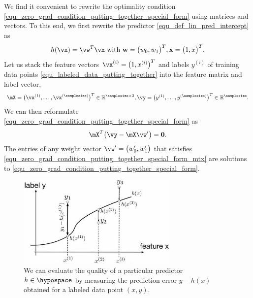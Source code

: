 \documentclass[12pt]{report}
\begin{document}
We find it convenient to rewrite the optimality condition \eqref{equ_zero_grad_condition_putting_together_special_form} 
using matrices and vectors. To this end, we first rewrite the 
predictor \eqref{equ_def_lin_pred_intercept} as 
$$ h(\vx) = \vw^{T} \vx \mbox{ with } \mathbf{w} = \big(w_{0},w_{1}\big)^{T}, \mathbf{x} = \big(1,x\big)^{T}.$$
Let us stack the feature vectors $\vx^{(i)} = \big(1,x^{(i)} \big)^{T}$ 
and labels $y^{(i)}$ of training data points \eqref{equ_labeled_data_putting_together} 
into the feature matrix and label vector, 
\begin{equation}
\mX  = \big(\vx^{(1)},\ldots,\vx^{(\samplesize)}\big)^{T} \in \mathbb{R}^{\samplesize \times 2}, \vy = \big(y^{(1)},\ldots,y^{(\samplesize)}\big)^{T} \in \mathbb{R}^{\samplesize}. 
\end{equation} 
We can then reformulate \eqref{equ_zero_grad_condition_putting_together_special_form} as 
\begin{equation}
\label{equ_zero_grad_condition_putting_together_special_form_mtx}
\mX^{T} \big( \vy - \mX \vw' \big) = \mathbf{0}. 
\end{equation} 
The entries of any weight vector $\vw' = \big(w_{0}',w_{1}'\big)$ that satisfies 
\eqref{equ_zero_grad_condition_putting_together_special_form_mtx} are solutions to 
\eqref{equ_zero_grad_condition_putting_together_special_form}. 




\begin{figure}[htbp]
    \centering
   \includegraphics[width=0.7\textwidth]{EmpError.jpg}  
    \caption{We can evaluate the quality of a particular predictor $h \in \hypospace$ by measuring the 
    prediction error $y- h(x)$ obtained for a labeled data point $(x,y)$. }
  \label{fig_emp_error}
\end{figure}
\end{document}
